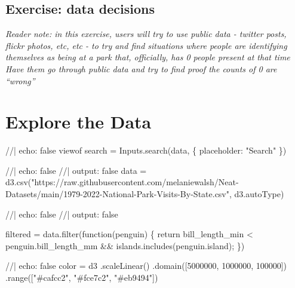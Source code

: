 \documentclass[
  letterpaper,
  DIV=11,
  numbers=noendperiod]{scrartcl}
\newenvironment{Shaded}{\begin{snugshade}}{\end{snugshade}}
\newcommand{\NormalTok}[1]{\textcolor[rgb]{0.00,0.23,0.31}{#1}}
\begin{document}
\subsection{Exercise: data decisions}\label{exercise-data-decisions}

\emph{Reader note: in this exercise, users will try to use public data -
twitter posts, flickr photos, etc, etc - to try and find situations
where people are identifying themselves as being at a park that,
officially, has 0 people present at that time Have them go through
public data and try to find proof the counts of 0 are ``wrong''}

\section{Explore the Data}

\begin{Shaded}
\begin{Highlighting}[]
\NormalTok{//| echo: false}
\NormalTok{viewof search = Inputs.search(data, \{}
\NormalTok{  placeholder: "Search"}
\NormalTok{\})}
\end{Highlighting}
\end{Shaded}

\begin{Shaded}
\begin{Highlighting}[]
\NormalTok{//| echo: false}
\NormalTok{//| output: false}
\NormalTok{data = d3.csv("https://raw.githubusercontent.com/melaniewalsh/Neat{-}Datasets/main/1979{-}2022{-}National{-}Park{-}Visits{-}By{-}State.csv", d3.autoType)}
\end{Highlighting}
\end{Shaded}

\begin{Shaded}
\begin{Highlighting}[]
\NormalTok{//| echo: false}
\NormalTok{//| output: false}


\NormalTok{filtered = data.filter(function(penguin) \{}
\NormalTok{  return bill\_length\_min \textless{} penguin.bill\_length\_mm \&\&}
\NormalTok{         islands.includes(penguin.island);}
\NormalTok{\})}
\end{Highlighting}
\end{Shaded}

\begin{Shaded}
\begin{Highlighting}[]
\NormalTok{//| echo: false}
\NormalTok{color = d3}
\NormalTok{  .scaleLinear()}
\NormalTok{  .domain([5000000, 1000000, 100000])}
\NormalTok{  .range(["\#cafcc2", "\#fce7c2", "\#eb9494"])}
\end{Highlighting}
\end{Shaded}
\end{document}
